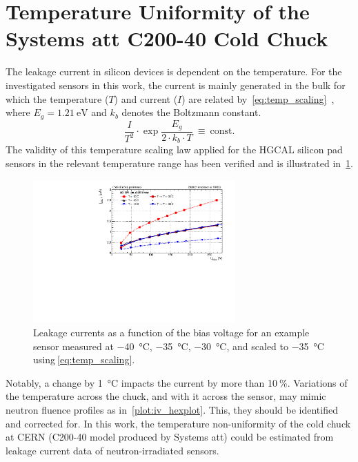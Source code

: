 \section{Temperature Uniformity of the Systems att C200-40 Cold Chuck}
\label{appendix:chuck_temp}
The leakage current in silicon devices is dependent on the temperature.
For the investigated sensors in this work, the current is mainly generated in the bulk for which the temperature ($T$) and current ($I$) are related by~\ref{eq:temp_scaling}~\cite{Chilingarov_2013}, where $E_g=\SI{1.21}{\electronvolt}$ and $k_b$ denotes the Boltzmann constant.
\begin{equation}
    \frac{I}{T^2}\cdot \exp{\frac{E_g}{2\cdot k_b \cdot T}}~\equiv~\text{const.}
    \label{eq:temp_scaling}
\end{equation}
The validity of this temperature scaling law applied for the HGCAL silicon pad sensors in the relevant temperature range has been verified and is illustrated in~\ref{plot:iv_tempscaling}.
\begin{figure}[h]
	\centering
	\includegraphics[width=0.69\textwidth]{plots/iv_temp_scaling/iv_overlay_ch24.pdf}
	\caption{
		Leakage currents as a function of the bias voltage for an example sensor measured at \SI{-40}{\celsius}, \SI{-35}{\celsius}, \SI{-30}{\celsius}, and scaled to \SI{-35}{\celsius} using$~$\ref{eq:temp_scaling}.
		}
	\label{plot:iv_tempscaling}
	\end{figure}
Notably, a change by \SI{1}{\celsius} impacts the current by more than 10$~\%$. 
Variations of the temperature across the chuck, and with it across the sensor, may mimic neutron fluence profiles as in~\ref{plot:iv_hexplot}. 
This, they should be identified and corrected for.\newline
In this work, the temperature non-uniformity of the cold chuck at CERN (C200-40 model produced by Systems att) could be estimated from leakage current data of neutron-irradiated sensors.
